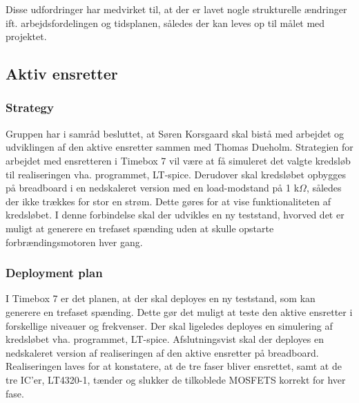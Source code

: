 Disse udfordringer har medvirket til, at der er lavet nogle strukturelle ændringer ift. arbejdsfordelingen og tidsplanen, således der kan leves op til målet med projektet. 

\subsection{Aktiv ensretter}
\label{sec:aktiv-ensretter}

\subsubsection{Strategy}
\label{sec:strategy}

Gruppen har i samråd besluttet, at Søren Korsgaard skal bistå med arbejdet og udviklingen af den aktive ensretter sammen med Thomas Dueholm. Strategien for arbejdet med ensretteren i Timebox 7 vil være at få simuleret det valgte kredsløb til realiseringen vha. programmet, LT-spice. Derudover skal kredsløbet opbygges på breadboard i en nedskaleret version med en load-modstand på 1 k$\Omega$, således der ikke trækkes for stor en strøm. Dette gøres for at vise funktionaliteten af kredsløbet. I denne forbindelse skal der udvikles en ny teststand, hvorved det er muligt at generere en trefaset spænding uden at skulle opstarte forbrændingsmotoren hver gang.

\subsubsection{Deployment plan}
\label{sec:deployment-plan}

I Timebox 7 er det planen, at der skal deployes en ny teststand, som kan generere en trefaset spænding. Dette gør det muligt at teste den aktive ensretter i forskellige niveauer og frekvenser. Der skal ligeledes deployes en simulering af kredsløbet vha. programmet, LT-spice.  Afslutningsvist skal der deployes en nedskaleret version af realiseringen af den aktive ensretter på breadboard. Realiseringen laves for at konstatere, at de tre faser bliver ensrettet, samt at de tre IC’er, LT4320-1, tænder og slukker de tilkoblede MOSFETS korrekt for hver fase.



